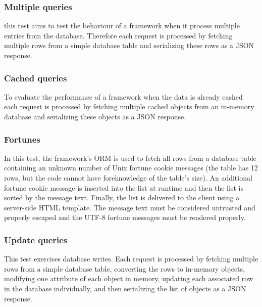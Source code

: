 \subsubsection{Multiple queries}
this test aims to test the behaviour of a framework when it process multiple entries from the database.
Therefore each request is processed by fetching multiple rows from a simple database table and serializing these rows as a JSON response.
\subsubsection{Cached queries}
To evaluate the performance of a framework when the data is already cashed  each request is processed by fetching multiple cached objects from an in-memory database and serializing these objects as a JSON response.
\subsubsection{Fortunes}
In this test, the framework's ORM is used to fetch all rows from a database table containing an unknown number of Unix fortune cookie messages (the table has 12 rows, but the code cannot have foreknowledge of the table's size). An additional fortune cookie message is inserted into the list at runtime and then the list is sorted by the message text. Finally, the list is delivered to the client using a server-side HTML template. The message text must be considered untrusted and properly escaped and the UTF-8 fortune messages must be rendered properly.

\subsubsection{Update queries}

This test exercises database writes. Each request is processed by fetching multiple rows from a simple database table, converting the rows to in-memory objects, modifying one attribute of each object in memory, updating each associated row in the database individually, and then serializing the list of objects as a JSON response.

